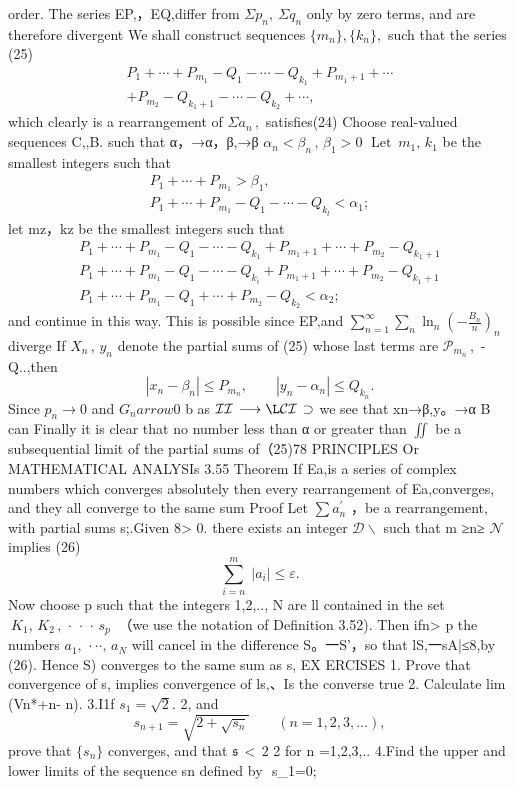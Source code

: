 order. The series EP,，EQ,differ from $\Sigma p_{n},\ \Sigma q_{n}$ only by zero terms, and are therefore divergent We shall construct sequences $\{m_{n}\},\{k_{n}\},$ such that the series (25) $$ \begin{array}{l}{{P_{1}+\cdots+P_{m_{1}}-Q_{1}-\cdots-Q_{k_{1}}+P_{m_{1}+1}+\cdots}}\\ {{+P_{m_{2}}-Q_{k_{1}+1}-\cdots-Q_{k_{2}}+\cdots,}}\end{array} $$ which clearly is a rearrangement of $\Sigma a_{n}\,,$ satisfies(24) Choose real-valued sequences {C,},{B.} such that α，→α，β,→β $\alpha_{n}<\beta_{n}\,,\,\beta_{1}>0$ $\operatorname{Let}\ m_{1},\,k_{1}$ be the smallest integers such that $$ \begin{array}{c}{{P_{1}+\cdots+P_{m_{1}}>\beta_{1},}}\\ {{P_{1}+\cdots+P_{m_{1}}-Q_{1}-\cdots-Q_{k_{l}}<\alpha_{1};}}\end{array} $$ let mz，kz be the smallest integers such that $$ \begin{array}{l}{{P_{1}+\cdots+P_{m_{1}}-Q_{1}-\cdots-Q_{k_{1}}+P_{m_{1}+1}+\cdots+P_{m_{2}}-Q_{k_{1}+1}}}\\ {{P_{1}+\cdots+P_{m_{1}}-Q_{1}-\cdots-Q_{k_{i}}+P_{m_{1}+1}+\cdots+P_{m_{2}}-Q_{k_{1}+1}}}\\ {{P_{1}+\cdots+P_{m_{1}}-Q_{1}+\cdots+P_{m_{2}}-Q_{k_{2}}<\alpha_{2};}}\end{array} $$ and continue in this way. This is possible since EP,and $\sum_{n=1}^{\infty}\sum_{n}\ln_{n}\left(-\frac{B_{n}}{n}\right)_{n}$ diverge If $X_{n}\,,\,y_{n}$ denote the partial sums of (25) whose last terms are $\textstyle{\mathcal{P}}_{m_{n}}\,,$ - Q..,then $$ |x_{n}-\beta_{n}|\leq P_{m_{n}},\qquad|y_{n}-\alpha_{n}|\leq Q_{k_{n}}. $$ Since $p_{n}\to0$ and $\scriptstyle G_{n} arrow0$ b as $\mathcal{I}\mathcal{I}\,\longrightarrow\L\mathcal{C}\mathcal{I}\,\supset$ we see that xn→β,y。→α B can Finally it is clear that no number less than α or greater than $\textstyle\iint$ be a subsequential limit of the partial sums of（25)78 PRINCIPLES Or MATHEMATICAL ANALYSIs 3.55 Theorem If Ea,is a series of complex numbers which converges absolutely then every rearrangement of Ea,converges, and they all converge to the same sum Proof Let $\textstyle\sum\!a_{n}^{\prime}$ ，be a rearrangement, with partial sums s;.Given 8> 0. there exists an integer ${\mathcal{D}}\backslash$ such that m ≥n≥ $\mathcal{N}$ implies (26) $$ \sum_{i=n}^{m}\;\left|a_{i}\right|\leq\varepsilon. $$ Now choose p such that the integers 1,2,.., N are ll contained in the set $\:K_{1},\,K_{2}\,,\,\cdot\,\cdot\,\cdot\,s_{p}\:$ （we use the notation of Definition 3.52). Then ifn> p the numbers $a_{1},\,\cdot\cdot\cdot,\,a_{N}$ will cancel in the difference S。一S'，so that lS,一sA|≤8,by (26). Hence {S)} converges to the same sum as {s,} EX ERCISES 1. Prove that convergence of {s,} implies convergence of {ls,}、Is the converse true 2. Calculate lim (Vn*+n- n). 3.I1f $s_{1}={\sqrt{2}}.$ 2, and $$ s_{n+1}={\sqrt{2+{\sqrt{s_{n}}}}}\qquad(n=1,2,3,\ldots), $$ prove that $\{s_{n}\}$ converges, and that $\scriptstyle{\mathfrak{s}}\,<\,2$ 2 for n =1,2,3,.. 4.Find the upper and lower limits of the sequence {sn} defined by $$ s_{1}=0;\qquad 